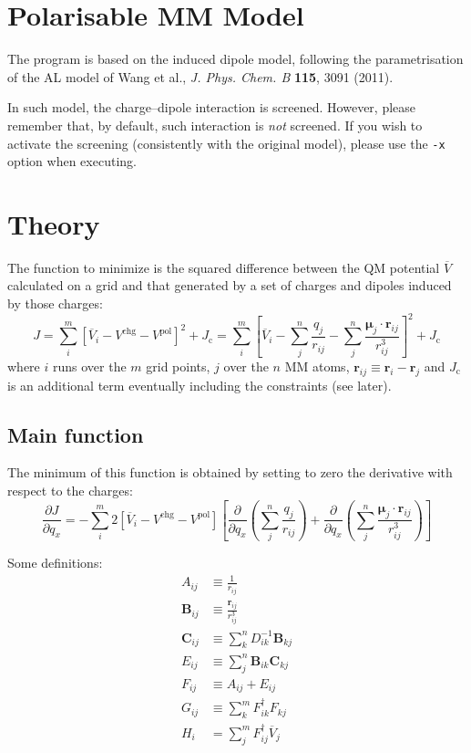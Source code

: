 \documentclass[a4paper]{report}
\newcommand{\bs}{\boldsymbol}
\newcommand{\mr}{\mathrm}
\begin{document}
\section*{Polarisable MM Model}

The program is based on the induced dipole model, following the parametrisation of the AL model of Wang et al., \emph{J. Phys. Chem. B} \textbf{115}, 3091 (2011).

In such model, the charge--dipole interaction is screened. However, please remember that, by default, such interaction is \emph{not} screened. If you wish to activate the screening (consistently with the original model), please use the \texttt{-x} option when executing.

\section*{Theory}

The function to minimize is the squared difference between the QM potential
$\overline{V}$ calculated on a grid and that generated by a set of charges and
dipoles induced by those charges:
\begin{equation}
J = \sum_i^m \left[ \overline{V}_i - V^\mr{chg} - V^\mr{pol} \right]^2 + J_\mr{c} = \sum_i^m
\left[ \overline{V}_i - \sum_j^n \frac{q_j}{r_{ij}} - \sum_j^n \frac{\bs{\mu}_j \cdot
\bs{r}_{ij}}{r_{ij}^3} \right]^2 + J_\mr{c}
\end{equation}
where $i$ runs over the $m$ grid points, $j$ over the $n$ MM atoms,
$\bs{r}_{ij}\equiv\bs{r}_i - \bs{r}_j$ and $J_\mr{c}$ is an additional term
eventually including the constraints (see later).

\subsection*{Main function}

The minimum of this function is obtained by setting to zero the derivative with
respect to the charges:
\begin{equation}
\label{deriv}
\frac{\partial J}{\partial q_x} = - \sum_i^m 2 \left[ \overline{V}_i - V^\mr{chg} -
V^\mr{pol} \right] \left[ \frac{\partial}{\partial q_x} \left(\sum_j^n
\frac{q_j}{r_{ij}}\right) + \frac{\partial}{\partial q_x} \left(\sum_j^n
\frac{\bs{\mu}_j \cdot \bs{r}_{ij}}{r_{ij}^3} \right)\right]
\end{equation}

Some definitions:
\begin{align}
A_{ij} &\equiv \frac{1}{r_{ij}} \\
\bs{B}_{ij} &\equiv \frac{\bs{r}_{ij}}{r_{ij}^3} \\
\bs{C}_{ij} &\equiv \sum_k^n D^{-1}_{ik}\bs{B}_{kj} \\
E_{ij} &\equiv \sum_j^n \bs{B}_{ik} \bs{C}_{kj} \\
F_{ij} &\equiv A_{ij} + E_{ij} \\
G_{ij} &\equiv \sum_k^m F_{ik}^\dagger F_{kj} \\
H_i &= \sum_j^m F_{ij}^\dagger \overline{V}_j 
\end{align}
\end{document}
